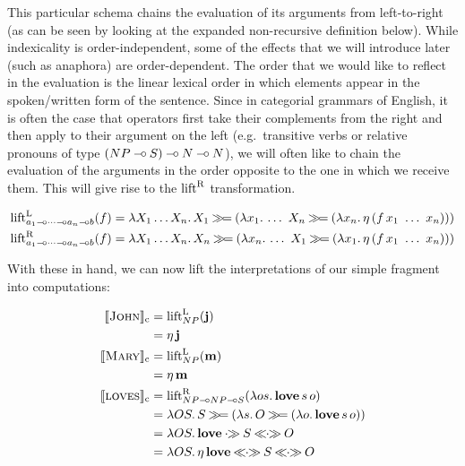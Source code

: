 This particular schema chains the evaluation of its arguments from
left-to-right (as can be seen by looking at the expanded non-recursive
definition below). While indexicality is order-independent, some of the
effects that we will introduce later (such as anaphora) are
order-dependent. The order that we would like to reflect in the evaluation
is the linear lexical order in which elements appear in the spoken/written
form of the sentence. Since in categorial grammars of English, it is often
the case that operators first take their complements from the right and
then apply to their argument on the left (e.g.\ transitive verbs or
relative pronouns of type $(NP \mathbin{{-}\mkern-3.5mu{\circ}} S) \mathbin{{-}\mkern-3.5mu{\circ}} N \mathbin{{-}\mkern-3.5mu{\circ}} N$), we will often
like to chain the evaluation of the arguments in the order opposite to the
one in which we receive them. This will give rise to the $\operatorname{lift}^{\mathrm{R}}$
transformation.

\begin{align*}
  \liftl_{a_1 \limp \cdots \limp a_n \limp b}(f) &= \lam{X_1 \ldots X_n}{X_1 \hsbind (\lam{x_1}{\ldots\ X_n \hsbind (\lam{x_n}{\etaE{(\ap{f}{x_1\ \ldots\ x_n})}})})} \\
  \liftr_{a_1 \limp \cdots \limp a_n \limp b}(f) &= \lam{X_1 \ldots X_n}{X_n \hsbind (\lam{x_n}{\ldots\ X_1 \hsbind (\lam{x_1}{\etaE{(\ap{f}{x_1\ \ldots\ x_n})}})})} \\
\end{align*}

With these in hand, we can now lift the interpretations of our simple
fragment into computations:

\begin{align*}
\sem{\abs{John}}_\petitc &= \liftl_{NP}(\obj{j}) \\
&= \etaE{\obj{j}} \\
\sem{\abs{Mary}}_\petitc &= \liftl_{NP}(\obj{m}) \\
&= \etaE{\obj{m}} \\
\sem{\abs{loves}}_\petitc &= \liftr_{NP \limp NP \limp S}(\lam{o s}{\app{\obj{love}}{s}{o}}) \\
&= \lam{O S}{S \hsbind (\lam{s}{O \hsbind (\lam{o}{\app{\obj{love}}{s}{o}})})} \\
&= \lam{O S}{\obj{love} \apr S \aplr O} \\
&= \lam{O S}{\etaE{\obj{love}} \aplr S \aplr O}
\end{align*}


